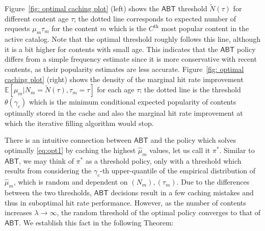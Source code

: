 \documentclass[10pt, conference, letterpaper]{IEEEtran}
\newcommand{\ABT}{\textsf{ABT}}
\newcommand{\mean}[1]{\mathbb{E}\!\left[#1\right]}
\begin{document}
Figure~\ref{fig: optimal caching plot} (left)  shows the  $\ABT$ threshold $\widetilde N(\tau)$ for different content age $\tau$; 
the dotted line corresponds to expected number of requests $\mu_m\tau_m$ for the content $m$ which is the $C^{\text{th}}$ most popular content in the active catalog.
Note that the optimal threshold roughly follows this line, although it is a bit higher for contents with small age. This indicates that the $\ABT$ policy differs from a simple frequency estimate since it is more conservative with recent contents, as their popularity estimates are less accurate. 
Figure~\ref{fig: optimal caching plot} (right) shows the density of the marginal hit rate improvement $\mean{\mu_m\big|N_m=\widetilde N(\tau),\tau_m=\tau}$ for each age $\tau$; the dotted line is the threshold $\theta(\gamma_c)$ which is the minimum conditional expected popularity of contents optimally stored in the cache and also the marginal hit rate improvement at which the iterative filling algorithm would stop.





There is an intuitive connection between $\ABT$ and the policy which solves optimally \eqref{eq:opt1} by caching the highest $\widehat \mu_m$ values, let us call it $\pi^*$. Similar to $\ABT$, we may think of $\pi^*$ as a threshold policy, only with a threshold 
which results from considering the $\gamma_c$-th upper-quantile of the empirical distribution of $\widehat \mu_m$, which is random and dependent on $(N_m),(\tau_m)$. 
Due to the differences between the two thresholds,  $\ABT$ decisions result in a few caching mistakes and thus in suboptimal hit rate performance. 
However, as the number of contents increases $\lambda\to\infty$, the random threshold of the optimal policy converges to that of $\ABT$. We establish this fact in the following Theorem:
\end{document}
